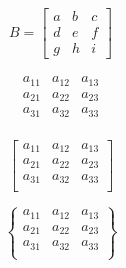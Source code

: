 \documentclass{article}
\begin{document}
\begin{equation*}
B = 
\begin{bmatrix}
a & b & c \\
d & e & f \\
g & h & i
\end{bmatrix}
\end{equation*}

\begin{equation}
   \begin{matrix} 
   a_{11} & a_{12} & a_{13}  \\
   a_{21} & a_{22} & a_{23}  \\
   a_{31} & a_{32} & a_{33}  \\
   \end{matrix} 
\end{equation}

\begin{equation}
  \left[
   \begin{matrix} 
   a_{11} & a_{12} & a_{13}  \\
   a_{21} & a_{22} & a_{23}  \\
   a_{31} & a_{32} & a_{33}  \\
   \end{matrix} 
  \right]
\end{equation}

\begin{equation}
  \left\{
   \begin{matrix} 
   a_{11} & a_{12} & a_{13}  \\
   a_{21} & a_{22} & a_{23}  \\
   a_{31} & a_{32} & a_{33}  \\
   \end{matrix} 
  \right\}
\end{equation}
\end{document}
